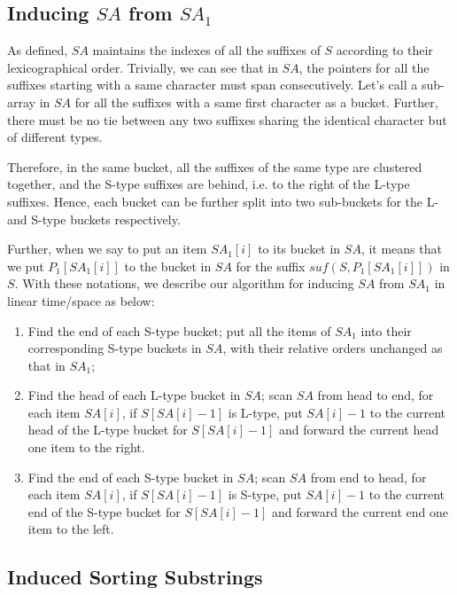 \documentclass{article}
\begin{document}
\subsection{Inducing $SA$ from $SA_1$}

As defined, $SA$ maintains the indexes of all the suffixes of $S$ according to their lexicographical order. Trivially, we can see that in $SA$, the pointers for all the suffixes starting with a same character must span consecutively. Let’s call a sub-array in $SA$ for all the suffixes with a same first character as a bucket. Further, there must be no tie between any two suffixes sharing the identical character but of different types.

Therefore, in the same bucket, all the suffixes of the same type are clustered together, and the S-type suffixes are behind, i.e. to the right of the L-type suffixes. Hence, each bucket can be further split into two sub-buckets for the L- and S-type buckets respectively.

Further, when we say to put an item $SA_{1}[i]$ to its bucket in $SA$, it means that we put $P_{1}[SA_{1}[i]]$ to the bucket in $SA$ for the suffix $suf(S, P_{1}[SA_{1}[i]])$ in $S$. With these notations, we describe our algorithm for inducing $SA$ from $SA_1$ in linear time/space as below:

\begin{enumerate}
\item Find the end of each S-type bucket; put all the items of $SA_1$ into their corresponding S-type buckets in $SA$, with their relative orders unchanged as that in $SA_1$;
\item Find the head of each L-type bucket in $SA$; scan $SA$ from head to end, for each item $SA[i]$, if $S[SA[i] - 1]$ is L-type, put $SA[i] - 1$ to the current head of the L-type bucket for $S[SA[i] - 1]$ and forward the current head one item to the right.
\item Find the end of each S-type bucket in $SA$; scan $SA$ from end to head, for each item $SA[i]$, if $S[SA[i] - 1]$ is S-type, put $SA[i] - 1$ to the current end of the S-type bucket for $S[SA[i] - 1]$ and forward the current end one item to the left.
\end{enumerate}

\subsection{Induced Sorting Substrings}
\end{document}
